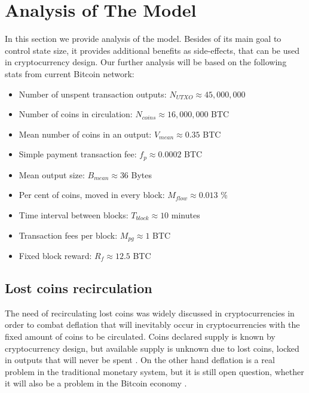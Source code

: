 \documentclass[]{article}   %
\begin{document}
\section{Analysis of The Model}
\label{sec:analysis}

In this section we provide analysis of the model. Besides of its main goal to control state size, it provides additional benefits as side-effects, that can be used in cryptocurrency design. Our further analysis will be based on the following stats from current Bitcoin network:

\begin{itemize}
  \item Number of unspent transaction outputs: $N_{UTXO} \approx 45,000,000$
  \item Number of coins in circulation: $N_{coins} \approx 16,000,000$ BTC
  \item Mean number of coins in an output: $V_{mean} \approx 0.35$ BTC
  \item Simple payment transaction fee: $f_{p} \approx 0.0002$ BTC
  \item Mean output size: $B_{mean} \approx 36$ Bytes
  \item Per cent of coins, moved in every block: $M_{flow} \approx 0.013$ \%
  \item Time interval between blocks: $T_{block} \approx 10$ minutes
  \item Transaction fees per block: $M_{pg} \approx 1$ BTC
  \item Fixed block reward: $R_{f} \approx 12.5$ BTC
\end{itemize}

\subsection{Lost coins recirculation}
\label{sec:re}

The need of recirculating lost coins was widely discussed in cryptocurrencies \cite{gjermundrod2014recirculating, gjermundrod2016going} in order to combat deflation that will inevitably occur in cryptocurrencies with the fixed amount of coins to be circulated. Coins declared supply is known by cryptocurrency design, but available supply is unknown due to lost coins, locked in outputs that will never be spent \cite{ron2013quantitative}. On the other hand deflation is a real problem in the traditional monetary system, but it is still open question, whether it will also be a problem in the Bitcoin economy \cite{bitcoinDeflationarySpiral, barber2012bitter}.
\end{document}
